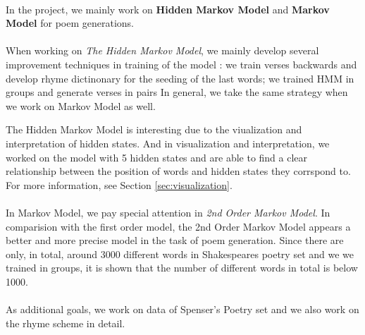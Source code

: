 \paragraph{}
In the project, we mainly work on \textbf{Hidden Markov Model} and \textbf{Markov Model} for poem generations. 
\paragraph{}
When working on \textit{The Hidden Markov Model}, we mainly develop several improvement techniques in training of the model : we train verses backwards and develop rhyme dictinonary for the seeding of the last words; we trained HMM in groups and generate verses in pairs In general, we take the same strategy when we work on Markov Model as well.

The Hidden Markov Model is interesting due to the viualization and interpretation of hidden states. And in visualization and interpretation, we worked on the model with 5 hidden states and are able to find a clear relationship between the position of words and hidden states they corrspond to. For more information, see Section \ref{sec:visualization}.

\paragraph{}
In Markov Model, we pay special attention in \textit{2nd Order Markov Model}. In comparision with the first order model, the 2nd Order Markov Model appears a better and more precise model in the task of poem generation. Since there are only, in total, around 3000 different words in Shakespeares poetry set and we we trained in groups, it is shown that the number of different words in total is below 1000.

\paragraph{}
As additional goals, we work on data of Spenser's Poetry set and we also work on the rhyme scheme in detail.